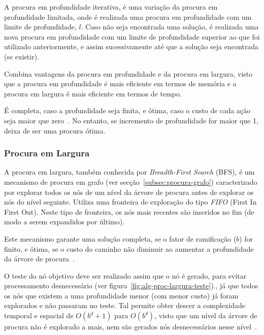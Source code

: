 A procura em profundidade iterativa, é uma variação da procura em profundidade limitada, onde é realizada uma procura em profundidade com um limite de profundidade, $l$.
Caso não seja encontrada uma solução, é realizada uma nova procura em profundidade com um limite de profundidade superior ao que foi utilizado anteriormente, e assim sucessivamente até que a solução seja encontrada (se existir).

Combina vantagens da procura em profundidade e da procura em largura, visto que a procura em profundidade é mais eficiente em termos de memória e a procura em largura é mais eficiente em termos de tempo.

É completa, caso a profundidade seja finita, e ótima, caso o custo de cada ação seja maior que zero~\cite{ist:leic:resumos:procura-cega}.
No entanto, se incremento de profundidade for maior que 1, deixa de ser uma procura ótima.

\subsubsection{Procura em Largura}\label{subsubsec:procura-largura}

A procura em largura, também conhecida por \textit{Breadth-First Search} (BFS), é um mecanismo de procura em grafo (ver secção~\ref{subsec:procura-grafo}) caracterizado por explorar todos os nós de um nível da árvore de procura antes de explorar os nós do nível seguinte. Utiliza uma fronteira de exploração do tipo \textit{FIFO} (First In First Out). Neste tipo de fronteira, os nós mais recentes são inseridos no fim (de modo a serem expandidos por último).

Este mecanismo garante uma solução completa, se o fator de ramificação ($b$) for finito, e ótima, se o custo do caminho não diminuir ao aumentar a profundidade da árvore de procura~\cite{ist:leic:resumos:procura-cega}.

O teste do nó objetivo deve ser realizado assim que o nó é gerado, para evitar processamento desnecessário (ver figura~\ref{fig:alg-proc-largura-teste}).,
já que todos os nós que existem a uma profundidade menor (com menor custo) já foram explorados e não passaram no teste.
Tal permite obter descer a complexidade temporal e espacial de $O(b^d+1)$ para $O(b^d)$, visto que um nível da árvore de procura não é explorado a mais, nem são gerados nós desnecessários nesse nível~\cite{ist:leic:resumos:procura-cega}.

